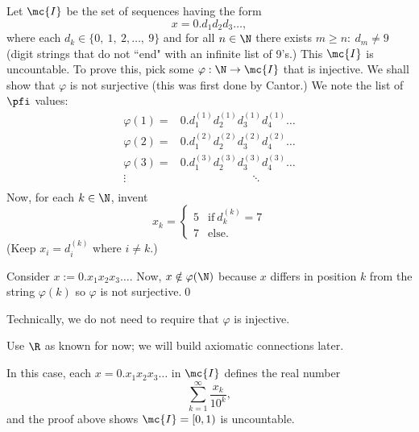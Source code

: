 \begin{example}
	Let \(\mc{I}\) be the set of sequences having the form
	\begin{equation*}
		x=0.d_1d_2d_3\dots,
	\end{equation*}
	where each \(d_k\in\{0,~1,~2,\dots,~9\}\) and for all \(n\in\N\) there exists \(m\geq n:~d_m\neq 9\) (digit strings that do not ``end" with an infinite list of 9's.) This \(\mc{I}\) is uncountable. To prove this, pick some \(\varphi:\N\to\mc{I}\) that is injective. We shall show that \(\varphi\) is not surjective (this was first done by Cantor.) We note the list of \(\pfi\) values:
	\begin{align*}
		\varphi(1)=&0.\boxed{d_1^{(1)}}d_2^{(1)}d_3^{(1)}d_4^{(1)}\dots\\
		\varphi(2)=&0.d_1^{(2)}\boxed{d_2^{(2)}}d_3^{(2)}d_4^{(2)}\dots\\
		\varphi(3)=&0.d_1^{(3)}d_2^{(3)}\boxed{d_3^{(3)}}d_4^{(3)}\dots\\
		\vdots&~~~~~~~~~~~~~~~~~~~~~~~~~~~~~\ddots\\
	\end{align*}
	Now, for each \(k\in\N\), invent 
	\begin{equation*}
		x_k=\begin{cases}
			5&\text{if}~d_k^{(k)}=7\\
			7&\text{else}.
		\end{cases}
	\end{equation*}
	(Keep \(x_i=d_i^{(k)}\) where \(i\neq k\).)
	
	\medskip
	
	Consider \(x:=0.x_1x_2x_3\dots\). Now, \(x\notin\varphi(\N)\) because \(x\) differs in position \(k\) from the string \(\varphi(k)\) so \(\varphi\) is not surjective.\qed
	\begin{note}
		Technically, we do not need to require that \(\varphi\) is injective.
	\end{note}
	\begin{note}
		Use \(\R\) as known for now; we will build axiomatic connections later.
	\end{note}
	In this case, each \(x=0.x_1x_2x_3\dots\) in \(\mc{I}\) defines the real number 
	\begin{equation*}
		\sum_{k=1}^{\infty}\frac{x_k}{10^k},
	\end{equation*}
	and the proof above shows \(\mc{I}=[0,1)\) is uncountable.
\end{example}